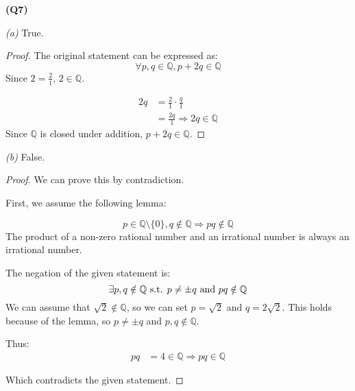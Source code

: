 \documentclass[12pt, letterpaper]{article}
\newcommand{\Q}{\mathbb{Q}}
\begin{document}
\textbf{(Q7)}

\textit{(a)} True.
\begin{proof}
    The original statement can be expressed as:
    \[
        \forall p,q \in \Q, p + 2q \in \Q
    \]
    Since $2 = \tfrac{2}{1}$, $2 \in \Q$.

    \begin{align*}
        2q & = \frac{2}{1} \cdot \frac{q}{1}\\
        & = \frac{2q}{1} \Rightarrow 2q \in \Q
    \end{align*}
    Since $\Q$ is closed under addition, $p + 2q \in \Q$.
\end{proof}

\textit{(b)} False.
\begin{proof}
    We can prove this by contradiction.

    First, we assume the following lemma:

    \[
        p \in \Q \setminus \{0\}, q \notin \Q \Rightarrow pq \notin \Q
    \]
    The product of a non-zero rational number and an irrational number
    is always an irrational number.

    The negation of the given statement is:
    \[
        \exists p, q \notin \Q \text{ s.t. } p \neq \pm q \text{ and } pq \notin \Q\\
    \]
    We can assume that $\sqrt{2} \notin \Q$, so we can set $p = \sqrt{2}$ and $q = 2\sqrt{2}$.
    This holds because of the lemma, so $p \neq \pm q$ and $p,q \notin \Q$.

    Thus:
    \begin{align*}
        pq & = 4 \in \Q \Rightarrow pq \in \Q
    \end{align*}

    Which contradicts the given statement.

\end{proof}
\newpage
\end{document}
